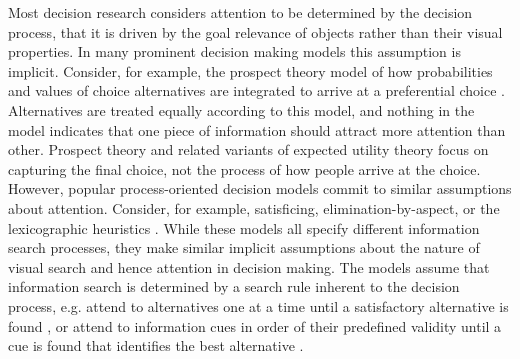 \documentclass[english,natbib,man,floatsintext]{apa6}
\begin{document}
Most decision research considers attention to be determined by the decision process, that it is driven by the goal relevance of objects rather than their visual properties. In many prominent decision making models this assumption is implicit. Consider, for example, the prospect theory model of how probabilities and values of choice alternatives are integrated to arrive at a preferential choice \citep{tversky1979}. Alternatives are treated equally according to this model, and nothing in the model indicates that one piece of information should attract more attention than other. Prospect theory and related variants of expected utility theory focus on capturing the final choice, not the process of how people arrive at the choice. However, popular process-oriented decision models commit to similar assumptions about attention. Consider, for example, satisficing, elimination-by-aspect, or the lexicographic heuristics \citep{payne1988, simon1956a}. While these models all specify different information search processes, they make similar implicit assumptions about the nature of visual search and hence attention in decision making. The  models assume that information search is determined by a search rule inherent to the decision process, e.g. attend to alternatives one at a time until a satisfactory alternative is found \citep{stuttgen2012}, or attend to information cues in order of their predefined validity until a cue is found that identifies the best alternative \citep{krefeld-schwalb2019a}.\\ 
\end{document}
